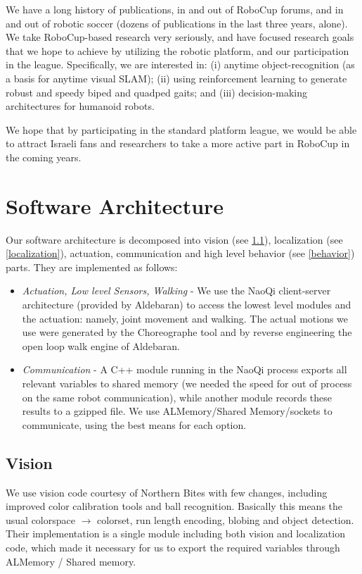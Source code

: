 \documentclass[runningheads,a4paper]{llncs}
\begin{document}
We have a long history of publications, in and out of RoboCup forums, and in
and out of robotic soccer (dozens of publications in the last three years, alone). We
take RoboCup-based research very seriously, and have focused research goals that we
hope to achieve by utilizing the robotic platform, and our participation in the league.
Specifically, we are interested in: (i) anytime object-recognition (as a basis for anytime
visual SLAM); (ii) using reinforcement learning to generate robust and speedy biped
and quadped gaits; and (iii) decision-making architectures for humanoid robots.

We hope that by participating in the standard platform league, we would be able to attract Israeli fans and researchers to take a more active part in RoboCup in the coming years.



\section{Software Architecture}
Our software architecture is decomposed into vision (see \ref{vision}), localization (see \ref{localization}), actuation, communication and high level behavior (see \ref{behavior}) parts. They are implemented as follows:
\begin{itemize}
\item \emph{Actuation, Low level Sensors, Walking} - We use the NaoQi client-server architecture (provided by Aldebaran) to access the lowest level modules and the actuation: namely, joint movement and walking. The actual motions we use were generated by the Choreographe tool and by reverse engineering the open loop walk engine of Aldebaran.
\item \emph{Communication} - A C++ module running in the NaoQi process exports all relevant variables to shared memory (we needed the speed for out of process on the same robot communication), while another module records these results to a gzipped file. We use ALMemory/Shared Memory/sockets to communicate, using the best means for each option.
\end{itemize}

\subsection{Vision}
\label{vision}
We use vision code courtesy of Northern Bites \cite{northern,northern-repo} with few changes, including improved color calibration tools and ball recognition. Basically this means the usual colorspace $\rightarrow$ colorset, run length encoding, blobing and object detection. Their implementation is a single module including both vision and localization code, which made it necessary for us to export the required variables through ALMemory / Shared memory.
\end{document}
